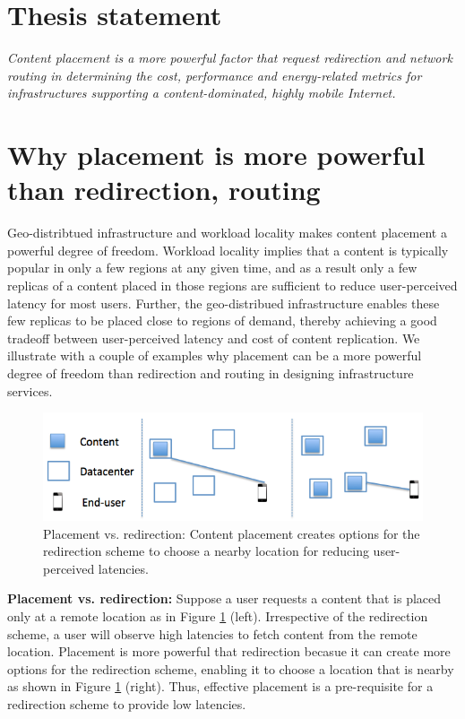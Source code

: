 \section{Thesis statement}

\emph{Content placement is a more powerful factor that request redirection and network routing in determining the cost, performance and energy-related metrics for infrastructures supporting a content-dominated, highly mobile Internet.}

\section{Why placement is more powerful than redirection, routing}

Geo-distribtued infrastructure and workload locality makes content placement a powerful degree of freedom. Workload locality implies that a content is typically popular in only a few regions at any given time, and as a result only a few replicas of a content placed in those regions  are sufficient to reduce user-perceived latency for most users. Further, the geo-distribued infrastructure enables these few replicas to be placed close to regions of demand, thereby achieving a good tradeoff between user-perceived latency and cost of content replication. We illustrate with a couple of examples why placement can be a more powerful degree of freedom than redirection and routing in designing infrastructure services.


\begin{figure}
	
	\centering
	\includegraphics[scale=0.5]{fig/placement-vs-redirection.png}
	\caption{Placement vs. redirection: Content placement creates options for the redirection scheme to choose a nearby location for reducing user-perceived latencies.}	
	\label{fig:placement-redirection}
\end{figure}


\textbf{Placement vs. redirection:} Suppose a user requests a content that is placed only at a remote location as in Figure \ref{fig:placement-redirection} (left). Irrespective of the redirection scheme, a user will observe high latencies to fetch content from the remote location. Placement is more powerful that redirection becasue it can create more options for the redirection scheme, enabling it to choose a location that is nearby as shown in Figure \ref{fig:placement-redirection} (right). Thus, effective placement is a pre-requisite for a redirection scheme to provide low latencies.


